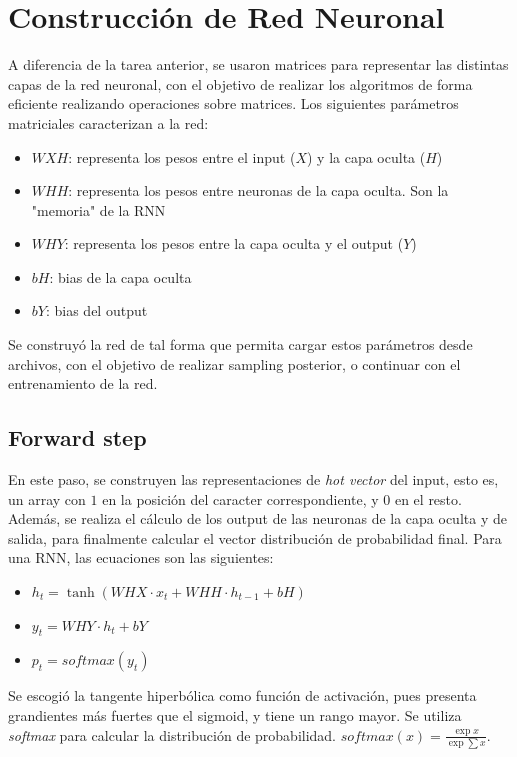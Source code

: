 \documentclass[11pt,letterpaper]{article}
\begin{document}
\section{Construcción de Red Neuronal}
A diferencia de la tarea anterior, se usaron matrices para representar las distintas capas 
de la red neuronal, con el objetivo de realizar los algoritmos de forma eficiente realizando 
operaciones sobre matrices. Los siguientes parámetros matriciales caracterizan a la red:

\begin{itemize}
	\item $WXH$: representa los pesos entre el input ($X$) y la capa oculta ($H$)
	\item $WHH$: representa los pesos entre neuronas de la capa oculta. Son la "memoria" de la RNN
	\item $WHY$: representa los pesos entre la capa oculta y el output ($Y$)
	\item $bH$: bias de la capa oculta
	\item $bY$: bias del output
\end{itemize}

Se construyó la red de tal forma que permita cargar estos parámetros desde archivos, con 
el objetivo de realizar sampling posterior, o continuar con el entrenamiento de la red.


\subsection{Forward step}
En este paso, se construyen las representaciones de \textit{hot vector} del input, esto es, 
un array con $1$ en la posición del caracter correspondiente, y $0$ en el resto. Además, 
se realiza el cálculo de los output de las neuronas de la capa oculta y de salida, para 
finalmente calcular el vector distribución de probabilidad final. Para una RNN, las ecuaciones 
son las siguientes:

\begin{itemize}
	\item $h_t = \tanh(WHX \cdot x_t + WHH \cdot h_{t-1} + bH)$
	\item $y_t = WHY \cdot h_t + bY$
	\item $p_t = softmax(y_t)$
\end{itemize}

Se escogió la tangente hiperbólica como función de activación, pues presenta grandientes más fuertes 
que el sigmoid, y tiene un rango mayor. Se utiliza \textit{softmax} para calcular la distribución de probabilidad. $softmax(x) = \frac{\exp x}{\exp {\sum x}}$.
\end{document}
